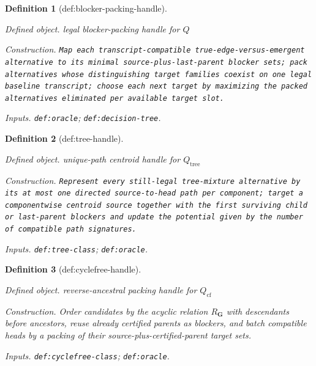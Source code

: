 \documentclass{article}
\newtheorem{definition}{Definition}
\begin{document}
\begin{definition}[def:blocker-packing-handle]\label{def:blocker-packing-handle}
\par\smallskip\noindent\emph{Defined object.} legal blocker-packing handle for \(Q\)
\par\smallskip\noindent\emph{Construction.} \texttt{Map each transcript-\allowbreak{}compatible true-\allowbreak{}edge-\allowbreak{}versus-\allowbreak{}emergent alternative to its minimal source-\allowbreak{}plus-\allowbreak{}last-\allowbreak{}parent blocker sets;\allowbreak{} pack alternatives whose distinguishing target families coexist on one legal baseline transcript;\allowbreak{} choose each next target by maximizing the packed alternatives eliminated per available target slot.}
\par\smallskip\noindent\emph{Inputs.} \texttt{def:\allowbreak{}oracle}; \texttt{def:\allowbreak{}decision-\allowbreak{}tree}.
\end{definition}

\begin{definition}[def:tree-handle]\label{def:tree-handle}
\par\smallskip\noindent\emph{Defined object.} unique-path centroid handle for \(Q_{\mathrm{tree}}\)
\par\smallskip\noindent\emph{Construction.} \texttt{Represent every still-\allowbreak{}legal tree-\allowbreak{}mixture alternative by its at most one directed source-\allowbreak{}to-\allowbreak{}head path per component;\allowbreak{} target a componentwise centroid source together with the first surviving child or last-\allowbreak{}parent blockers and update the potential given by the number of compatible path signatures.}
\par\smallskip\noindent\emph{Inputs.} \texttt{def:\allowbreak{}tree-\allowbreak{}class}; \texttt{def:\allowbreak{}oracle}.
\end{definition}

\begin{definition}[def:cyclefree-handle]\label{def:cyclefree-handle}
\par\smallskip\noindent\emph{Defined object.} reverse-ancestral packing handle for \(Q_{\mathrm{cf}}\)
\par\smallskip\noindent\emph{Construction.} Order candidates by the acyclic relation \(R_{\mathbf G}\) with descendants before ancestors, reuse already certified parents as blockers, and batch compatible heads by a packing of their source-plus-certified-parent target sets.
\par\smallskip\noindent\emph{Inputs.} \texttt{def:\allowbreak{}cyclefree-\allowbreak{}class}; \texttt{def:\allowbreak{}oracle}.
\end{definition}
\end{document}
